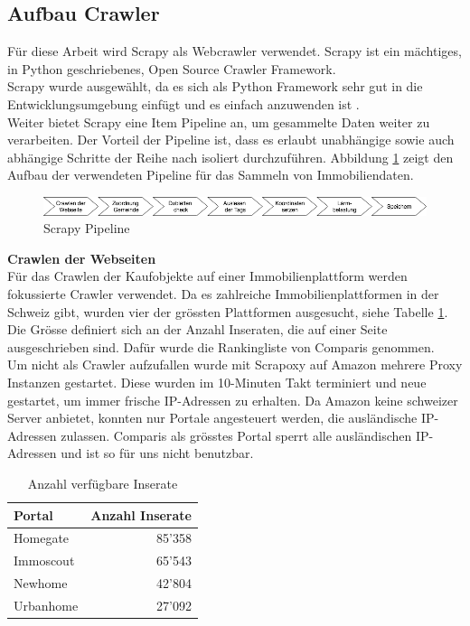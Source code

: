 \subsection{Aufbau Crawler}
Für diese Arbeit wird Scrapy als Webcrawler verwendet. Scrapy ist ein mächtiges, in Python geschriebenes, Open Source Crawler Framework.\\
Scrapy wurde ausgewählt, da es sich als Python Framework sehr gut in die Entwicklungsumgebung einfügt und es einfach anzuwenden ist \cite{scrapy}.\\
Weiter bietet Scrapy eine Item Pipeline an, um gesammelte Daten weiter zu verarbeiten. Der Vorteil der Pipeline ist, dass es erlaubt unabhängige sowie auch abhängige Schritte der Reihe nach isoliert durchzuführen. Abbildung \ref{fig:scrapy} zeigt den Aufbau der verwendeten Pipeline für das Sammeln von Immobiliendaten.\\[2ex]
\begin{figure}[h!]
\centering
\includegraphics[width=\textwidth]{images/scrapy.png}
\caption[Scrapy Pipeline]{Scrapy Pipeline}%
\label{fig:scrapy}
\end{figure}
\newline
%
\textbf{Crawlen der Webseiten}\\
Für das Crawlen der Kaufobjekte auf einer Immobilienplattform werden fokussierte Crawler verwendet. Da es zahlreiche Immobilienplattformen in der Schweiz gibt, wurden vier der grössten Plattformen ausgesucht, siehe Tabelle \ref{tab:portals}. Die Grösse definiert sich an der Anzahl Inseraten, die auf einer Seite ausgeschrieben sind. Dafür wurde die Rankingliste von Comparis genommen.\\
Um nicht als Crawler aufzufallen wurde mit Scrapoxy auf Amazon mehrere Proxy Instanzen gestartet. Diese wurden im 10-Minuten Takt terminiert und neue gestartet, um immer frische IP-Adressen zu erhalten. Da Amazon keine schweizer Server anbietet, konnten nur Portale angesteuert werden, die ausländische IP-Adressen zulassen. Comparis als grösstes Portal sperrt alle ausländischen IP-Adressen und ist so für uns nicht benutzbar.\\[2ex]
\begin{table}[ht]
\centering
{}
\begin{tabular}{@{}lr@{}}
\toprule
Portal & Anzahl Inserate \\
\midrule
Homegate & 85'358\\
Immoscout & 65'543\\
Newhome & 42'804\\
Urbanhome & 27'092\\
\bottomrule
\end{tabular}
\caption{Anzahl verfügbare Inserate}
\label{tab:portals}
\end{table}
